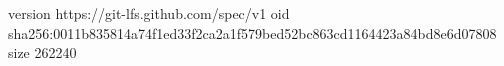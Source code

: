 version https://git-lfs.github.com/spec/v1
oid sha256:0011b835814a74f1ed33f2ca2a1f579bed52bc863cd1164423a84bd8e6d07808
size 262240
